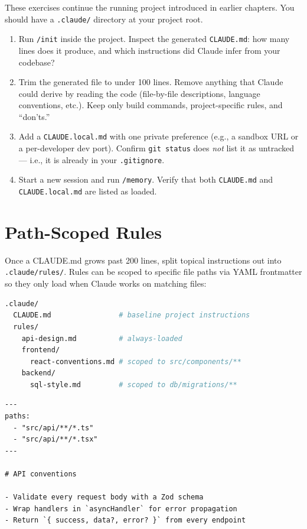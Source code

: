 \begin{exercisebox}
These exercises continue the running project introduced in earlier chapters.
You should have a \texttt{.claude/} directory at your project root.

\begin{enumerate}
  \item Run \texttt{/init} inside the project. Inspect the generated
        \texttt{CLAUDE.md}: how many lines does it produce, and which
        instructions did Claude infer from your codebase?
  \item Trim the generated file to under 100 lines. Remove anything that
        Claude could derive by reading the code (file-by-file
        descriptions, language conventions, etc.). Keep only build
        commands, project-specific rules, and ``don'ts.''
  \item Add a \texttt{CLAUDE.local.md} with one private preference (e.g.,
        a sandbox URL or a per-developer dev port). Confirm
        \texttt{git status} does \emph{not} list it as untracked — i.e.,
        it is already in your \texttt{.gitignore}.
  \item Start a new session and run \texttt{/memory}. Verify that both
        \texttt{CLAUDE.md} and \texttt{CLAUDE.local.md} are listed as
        loaded.
\end{enumerate}
\end{exercisebox}

\section{Path-Scoped Rules}
\label{sec:claude-rules}


Once a CLAUDE.md grows past 200 lines, split topical instructions out into
\texttt{.claude/rules/}. Rules can be scoped to specific file paths via YAML
frontmatter so they only load when Claude works on matching files:

\begin{lstlisting}[language=bash,caption={Layout of \texttt{.claude/rules/}}]
.claude/
  CLAUDE.md                # baseline project instructions
  rules/
    api-design.md          # always-loaded
    frontend/
      react-conventions.md # scoped to src/components/**
    backend/
      sql-style.md         # scoped to db/migrations/**
\end{lstlisting}

\begin{lstlisting}[caption={A path-scoped rule}]
---
paths:
  - "src/api/**/*.ts"
  - "src/api/**/*.tsx"
---

# API conventions

- Validate every request body with a Zod schema
- Wrap handlers in `asyncHandler` for error propagation
- Return `{ success, data?, error? }` from every endpoint
\end{lstlisting}

